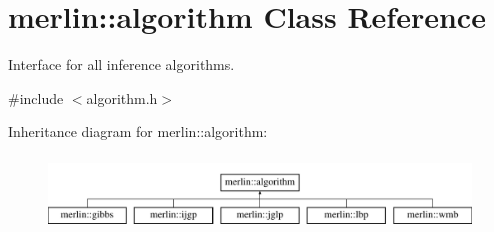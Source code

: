 \hypertarget{classmerlin_1_1algorithm}{}\section{merlin\+:\+:algorithm Class Reference}
\label{classmerlin_1_1algorithm}


Interface for all inference algorithms.  




{\ttfamily \#include $<$algorithm.\+h$>$}

Inheritance diagram for merlin\+:\+:algorithm\+:\begin{figure}[H]
\begin{center}
\leavevmode
\includegraphics[height=2.000000cm]{classmerlin_1_1algorithm}
\end{center}
\end{figure}
